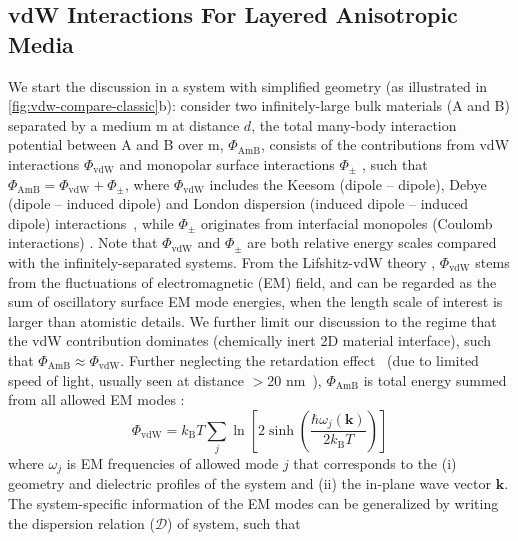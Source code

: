 \subsection{vdW Interactions  For Layered Anisotropic Media}
\label{sec:vdw-gener-model-layer}

We start the discussion in a system with simplified geometry (as
illustrated in \autoref{fig:vdw-compare-classic}b): consider two
infinitely-large bulk materials (A and B) separated by a medium m at
distance \(d\), the total many-body interaction potential between A
and B over m, \(\Phi_{\mathrm{AmB}}\), consists of the contributions
from vdW interactions \(\Phi_{\mathrm{vdW}}\) and mono\-polar surface
interactions \(\Phi_{\pm}\)
\cite{van_Oss_1987_monopolar,Van_Oss_1988}, such that
$\Phi_{\mathrm{AmB}} = \Phi_{\mathrm{vdW}} + \Phi_{\pm}$, where
\(\Phi_{\mathrm{vdW}}\) includes the Keesom (dipole -- dipole), Debye
(dipole -- induced dipole) and London dispersion (induced dipole --
induced dipole) interactions~\cite{Israelachvili_2011_book}, while
\(\Phi_{\pm}\) originates from interfacial monopoles (Coulomb
interactions) \cite{van_Oss_1987_monopolar}.
%
Note that $\Phi_{\mathrm{vdW}}$ and $\Phi_{\pm}$ are both relative
energy scales compared with the infinitely-separated systems.
%
From the Lifshitz-vdW theory \cite{Dzyaloshinskii_1961_lifshitz},
\(\Phi_{\mathrm{vdW}}\) stems from the fluctuations of electromagnetic
(EM) field, and can be regarded as the sum of oscillatory surface EM
mode energies, when the length scale of interest is larger than
atomistic details.
%
We further limit our discussion to the regime that the vdW
contribution dominates (\ie chemically inert 2D material interface),
such that $\Phi_{\mathrm{AmB}} \approx \Phi_{\mathrm{vdW}}$.  Further
neglecting the retardation effect~\cite{Dryden_2015_gecko} (due to
limited speed of light, usually seen at distance $>$20
nm~\cite{parsegian_van_2010_book}),
$\Phi_{\mathrm{AmB}}$ is total energy summed from all allowed EM modes
\cite{Li_2005_diele}:
\begin{equation}
\label{eq:vdw-EM-energy}
\Phi_{\mathrm{vdW}} = k_{\mathrm{B}} T \sum_{j} \ln \left[2 \sinh\left(\frac{\hbar \omega_{j}(\mathbf{k})}{2 k_{\mathrm{B}} T}\right)\right] 
\end{equation}
where \(\omega_{j}\) is EM frequencies of allowed mode $j$ that
corresponds to the (i) geometry and dielectric profiles of the system
and (ii) the in-plane wave vector \(\mathbf{k}\).
%
The system-specific information of the EM modes can be generalized by
writing the dispersion relation ($\mathcal{D}$) of system, such that
